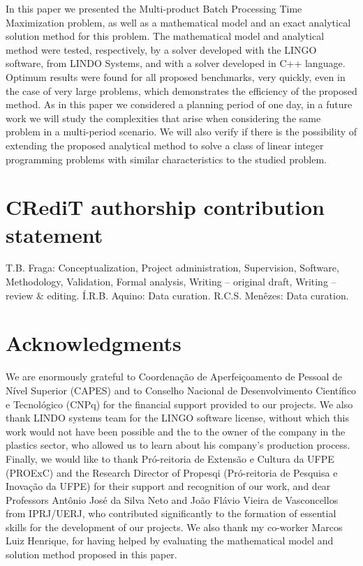 \documentclass[authoryear,manuscript,12pt]{elsarticle}
\begin{document}
In this paper we presented the Multi-product Batch Processing Time Maximization problem, as well as a mathematical model and an exact analytical solution method for this problem. The mathematical model and analytical method were tested, respectively, by a solver developed with the LINGO software, from LINDO Systems, and with a solver developed in C++ language. Optimum results were found for all proposed benchmarks, very quickly, even in the case of very large problems, which demonstrates the efficiency of the proposed method. As in this paper we considered a planning period of one day, in a future work we will study the complexities that arise when considering the same problem in a multi-period scenario. We will also verify if there is the possibility of extending the proposed analytical method to solve a class of linear integer programming problems with similar characteristics to the studied problem.

\section{CRediT authorship contribution statement} 
\label{sec:contributions}

T.B. Fraga: Conceptualization, Project administration, Supervision, Software, Methodology, Validation, Formal analysis, Writing – original draft, Writing – review \& editing. Í.R.B. Aquino: Data curation. R.C.S. Menêzes: Data curation.

\section{Acknowledgments}
\label{sec:acknowledgments}

We are enormously grateful to Coordenação de Aperfeiçoamento de Pessoal de Nível Superior (CAPES) and to Conselho Nacional de Desenvolvimento Científico e Tecnológico (CNPq) for the financial support provided to our projects. We also thank LINDO systems team for the LINGO software license, without which this work would not have been possible and the to the owner of the company in the plastics sector, who allowed us to learn about his company's production process. Finally, we would like to thank Pró-reitoria de Extensão e Cultura da UFPE (PROExC) and the Research Director of Propesqi (Pró-reitoria de Pesquisa e Inovação da UFPE) for their support and recognition of our work, and dear Professors Antônio José da Silva Neto and João Flávio Vieira de Vasconcellos from IPRJ/UERJ, who contributed significantly to the formation of essential skills for the development of our projects. We also thank my co-worker Marcos Luiz Henrique, for having helped by evaluating the mathematical model and solution method proposed in this paper.
\end{document}
